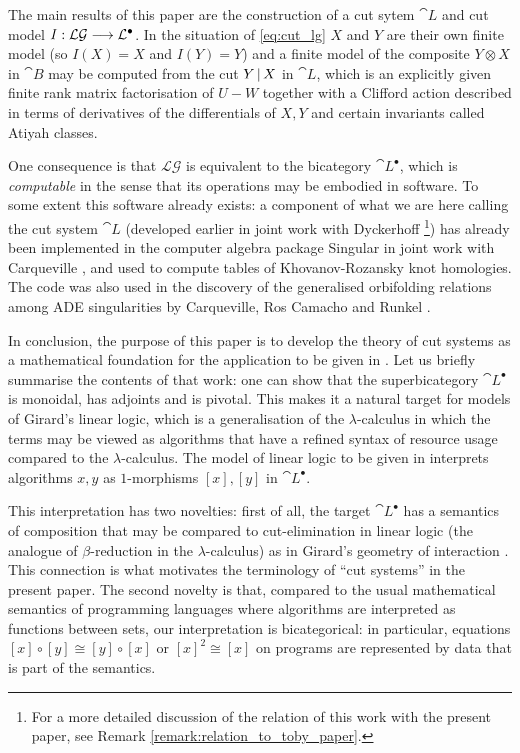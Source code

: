 \documentclass[english,letter paper,12pt,leqno]{article}
\theoremstyle{example}
\numberwithin{equation}{section}
\def\LG{\mathcal{LG}}
\begin{document}
The main results of this paper are the construction of a cut sytem $\cat{L}$ and cut model $I: \LG \lto \cat{L}^\bullet$. In the situation of \eqref{eq:cut_lg} $X$ and $Y$ are their own finite model (so $I(X) = X$ and $I(Y) = Y$) and a finite model of the composite $Y \otimes X$ in $\cat{B}$ may be computed from the cut $Y \,|\, X$ in $\cat{L}$, which is an explicitly given finite rank matrix factorisation of $U - W$ together with a Clifford action described in terms of derivatives of the differentials of $X,Y$ and certain invariants called Atiyah classes.

One consequence is that $\LG$ is equivalent to the bicategory $\cat{L}^\bullet$, which is \emph{computable} in the sense that its operations may be embodied in software. To some extent this software already exists: a component of what we are here calling the cut system $\cat{L}$ (developed earlier in joint work with Dyckerhoff \cite{dm1102.2957}\footnote{For a more detailed discussion of the relation of this work with the present paper, see Remark \ref{remark:relation_to_toby_paper}.}) has already been implemented in the computer algebra package Singular in joint work with Carqueville \cite{khovhompaper}, and used to compute tables of Khovanov-Rozansky knot homologies. The code was also used in the discovery of the generalised orbifolding relations among ADE singularities by Carqueville, Ros Camacho and Runkel \cite{ade}. 

\medskip
In conclusion, the purpose of this paper is to develop the theory of cut systems as a mathematical foundation for the application to be given in \cite{cutsystems2}. Let us briefly summarise the contents of that work: one can show that the superbicategory $\cat{L}^\bullet$ is monoidal, has adjoints and is pivotal. This makes it a natural target for models of Girard's linear logic, which is a generalisation of the $\lambda$-calculus in which the terms may be viewed as algorithms that have a refined syntax of resource usage compared to the $\lambda$-calculus. The model of linear logic to be given in \cite{cutsystems2} interprets algorithms $x,y$ as $1$-morphisms $[x],[y]$ in $\cat{L}^\bullet$. 

This interpretation has two novelties: first of all, the target $\cat{L}^\bullet$ has a semantics of composition that may be compared to cut-elimination in linear logic (the analogue of $\beta$-reduction in the $\lambda$-calculus) as in Girard's geometry of interaction \cite{girard_towards}. This connection is what motivates the terminology of ``cut systems'' in the present paper. The second novelty is that, compared to the usual mathematical semantics of programming languages where algorithms are interpreted as functions between sets, our interpretation is bicategorical: in particular, equations $[x] \circ [y] \cong [y] \circ [x]$ or $[x]^2 \cong [x]$ on programs are represented by data that is part of the semantics.
\end{document}
